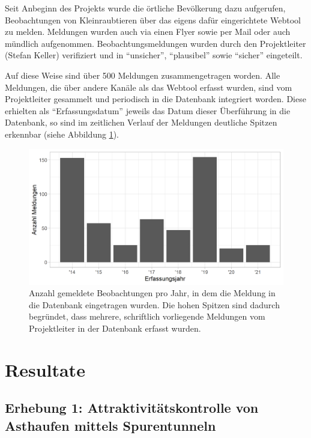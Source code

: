 \documentclass[
  oneside]{scrbook}
\begin{document}
Seit Anbeginn des Projekts wurde die örtliche Bevölkerung dazu aufgerufen, Beobachtungen von Kleinraubtieren über das eigens dafür eingerichtete Webtool zu melden. Meldungen wurden auch via einen Flyer sowie per Mail oder auch mündlich aufgenommen. Beobachtungsmeldungen wurden durch den Projektleiter (Stefan Keller) verifiziert und in ``unsicher'', ``plausibel'' sowie ``sicher'' eingeteilt.

Auf diese Weise sind über 500 Meldungen zusammengetragen worden. Alle Meldungen, die über andere Kanäle als das Webtool erfasst wurden, sind vom Projektleiter gesammelt und periodisch in die Datenbank integriert worden. Diese erhielten als ``Erfassungsdatum'' jeweils das Datum dieser Überführung in die Datenbank, so sind im zeitlichen Verlauf der Meldungen deutliche Spitzen erkennbar (siehe Abbildung \ref{fig:beobachtungsmeldungenhistogramm}).



\begin{figure}
\includegraphics[width=1\linewidth]{images/beobachtungsmeldungen_histogramm} \caption{Anzahl gemeldete Beobachtungen pro Jahr, in dem die Meldung in die Datenbank eingetragen wurden. Die hohen Spitzen sind dadurch begründet, dass mehrere, schriftlich vorliegende Meldungen vom Projektleiter in der Datenbank erfasst wurden.}\label{fig:beobachtungsmeldungenhistogramm}
\end{figure}

\hypertarget{resultate}{%
\chapter{Resultate}\label{resultate}}

\hypertarget{erhebung-1-attraktivituxe4tskontrolle-von-asthaufen-mittels-spurentunneln-1}{%
\section{Erhebung 1: Attraktivitätskontrolle von Asthaufen mittels Spurentunneln}\label{erhebung-1-attraktivituxe4tskontrolle-von-asthaufen-mittels-spurentunneln-1}}
\end{document}
